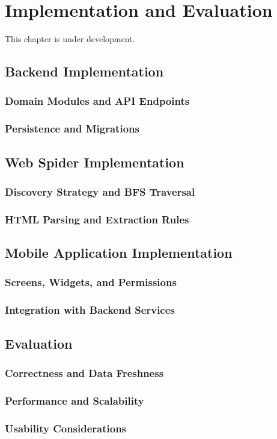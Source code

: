 \chapter{Implementation and Evaluation}
\label{chap:implementation_and_evaluation}

This chapter is under development.

\section{Backend Implementation}
\subsection{Domain Modules and API Endpoints}
\subsection{Persistence and Migrations}

\section{Web Spider Implementation}
\subsection{Discovery Strategy and BFS Traversal}
\subsection{HTML Parsing and Extraction Rules}

\section{Mobile Application Implementation}
\subsection{Screens, Widgets, and Permissions}
\subsection{Integration with Backend Services}

\section{Evaluation}
\subsection{Correctness and Data Freshness}
\subsection{Performance and Scalability}
\subsection{Usability Considerations}
